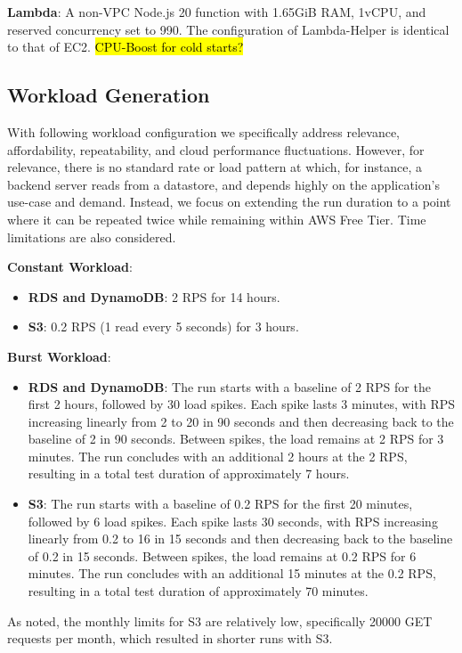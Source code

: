 \textbf{Lambda}:
A non-VPC Node.js 20 function with 1.65GiB RAM, 1vCPU, and reserved concurrency set to 990. The configuration of Lambda-Helper is identical to that of EC2. \hl{CPU-Boost for cold starts?}

\subsection{Workload Generation}
\label{sec:loads}

With following workload configuration we specifically address relevance, affordability, repeatability, and cloud performance fluctuations. However, for relevance, there is no standard rate or load pattern at which, for instance, a backend server reads from a datastore, and depends highly on the application's use-case and demand. Instead, we focus on extending the run duration to a point where it can be repeated twice while remaining within AWS Free Tier. Time limitations are also considered.

\textbf{Constant Workload}:
\begin{itemize}
	\item \textbf{RDS and DynamoDB}: 2 RPS for 14 hours.
	\item \textbf{S3}: 0.2 RPS (1 read every 5 seconds) for 3 hours.
\end{itemize}

\textbf{Burst Workload}:
\begin{itemize}
	\item \textbf{RDS and DynamoDB}: The run starts with a baseline of 2 RPS for the first 2 hours, followed by 30 load spikes. Each spike lasts 3 minutes, with RPS increasing linearly from 2 to 20 in 90 seconds and then decreasing back to the baseline of 2 in 90 seconds. Between spikes, the load remains at 2 RPS for 3 minutes. The run concludes with an additional 2 hours at the 2 RPS, resulting in a total test duration of approximately 7 hours.
	\item \textbf{S3}: The run starts with a baseline of 0.2 RPS for the first 20 minutes, followed by 6 load spikes. Each spike lasts 30 seconds, with RPS increasing linearly from 0.2 to 16 in 15 seconds and then decreasing back to the baseline of 0.2 in 15 seconds. Between spikes, the load remains at 0.2 RPS for 6 minutes. The run concludes with an additional 15 minutes at the 0.2 RPS, resulting in a total test duration of approximately 70 minutes.
\end{itemize}

As noted, the monthly limits for S3 are relatively low, specifically 20000 GET requests per month, which resulted in shorter runs with S3.

